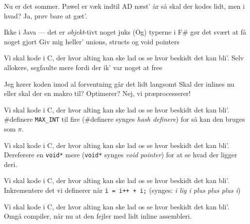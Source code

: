\documentclass[a4paper,11pt]{article}
\begin{document}
\begin{song}
    Nu er det sommer.
    Pawel er væk indtil AD næst' år
    så skal der kodes lidt,
    men i hvad? Ja, prøv bare at gæt'.

    Ikke i Java --- det er \emph{objekt}-tivt noget juks
    (Og) typerne i F\# gør det svært at få noget gjort
    Giv mig heller' unions, structs og void pointers

    Vi skal kode i C,
    der hvor alting kan ske
    lad os se hvor beskidt det kan bli'.
    Selv allokere, segfaulte mere
    fordi der ik' var noget at free

    Jeg kører koden
    imod al forventning går det lidt langsomt
    Skal der inlines nu
    eller skal der en makro til?
    Optimerer? Nej, vi præprocesserer!

    Vi skal kode i C,
    der hvor alting kan ske
    lad os se hvor beskidt det kan bli'.
    \#definere \texttt{MAX\_INT} til fire (\#definere synges \emph{hash definere})
    for så kan den bruges som $\pi$.

    Vi skal kode i C,
    der hvor alting kan ske
    lad os se hvor beskidt det kan bli'.
    Dereferere en \texttt{void*} mere (\texttt{void*} synges \emph{void pointer})
    for at se hvad der ligger deri.


    Vi skal kode i C,
    der hvor alting kan ske
    lad os se hvor beskidt det kan bli'.
    Inkrementere det vi definerer
    når \texttt{i = i++ + i;} (synges: \emph{i lig i plus plus plus i})

    Vi skal kode i C,
    der hvor alting kan ske
    lad os se hvor beskidt det kan bli'.
    Omgå compiler, når nu at den fejler
    med lidt inline assembleri.

\end{song}
\end{document}
